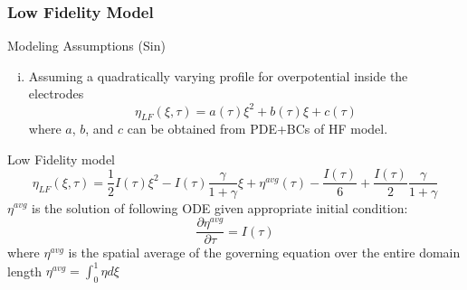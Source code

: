 \documentclass[10pt,xcolor=dvipsnames,compress]{beamer}
\begin{document}
\begin{frame}
\frametitle{Low Fidelity Model}
\vfill


\begin{alertblock}{Modeling Assumptions (Sin)}
\begin{enumerate}[i.]

\item Assuming a quadratically varying profile for overpotential inside the electrodes
\begin{equation*}\label{eq:quadratic}
\eta_{LF} (\xi,\tau)= a(\tau)\xi^2 + b(\tau)\xi + c(\tau)
\end{equation*}
where $a$, $b$, and $c$ can be obtained from PDE+BCs of HF model.

\end{enumerate}
\end{alertblock}

\begin{block}{Low Fidelity model}
\begin{equation*}\label{eq:LF}
\eta_{LF}(\xi,\tau) = 
\frac{1}{2}I(\tau)\xi^2 - I(\tau) \frac{\gamma}{1+\gamma}\xi + {\eta}^{avg}(\tau) - \frac{I(\tau)}{6} + \frac{I(\tau)}{2}\frac{\gamma}{1+\gamma}
\end{equation*}
${\eta}^{avg}$ is the solution of following ODE given appropriate initial condition:
\begin{equation*}\label{eq:LF_avg}
\frac{\partial{\eta}^{avg}}{\partial\tau} = I(\tau)
\end{equation*}
%
where $\eta^{avg}$ is the spatial
average of the governing equation over the entire domain length
%
$
\eta^{avg} = \int_0^1 \eta d\xi 
$
\end{block}


\vfill
\end{frame}
\end{document}
